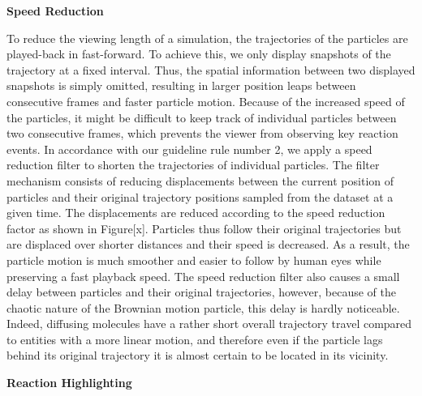 
\textbf{Speed Reduction}

To reduce the viewing length of a simulation, the trajectories of the particles are played-back in fast-forward.
To achieve this, we only display snapshots of the trajectory at a fixed interval.
Thus, the spatial information between two displayed snapshots is simply omitted, resulting in larger position leaps between consecutive frames and faster particle motion.
Because of the increased speed of the particles, it might be difficult to keep track of individual particles between two consecutive frames, which prevents the viewer from observing key reaction events.
In accordance with our guideline rule number 2, we apply a speed reduction filter to shorten the trajectories of individual particles.
The filter mechanism consists of reducing displacements between the current position of particles and their original trajectory positions sampled from the dataset at a given time.
The displacements are reduced according to the speed reduction factor as shown in Figure[x].
Particles thus follow their original trajectories but are displaced over shorter distances and their speed is decreased.
As a result, the particle motion is much smoother and easier to follow by human eyes while preserving a fast playback speed.
The speed reduction filter also causes a small delay between particles and their original trajectories, however, because of the chaotic nature of the Brownian motion particle, this delay is hardly noticeable.
Indeed, diffusing molecules have a rather short overall trajectory travel compared to entities with a more linear motion, and therefore even if the particle lags behind its original trajectory it is almost certain to be located in its vicinity.


\textbf{Reaction Highlighting}


